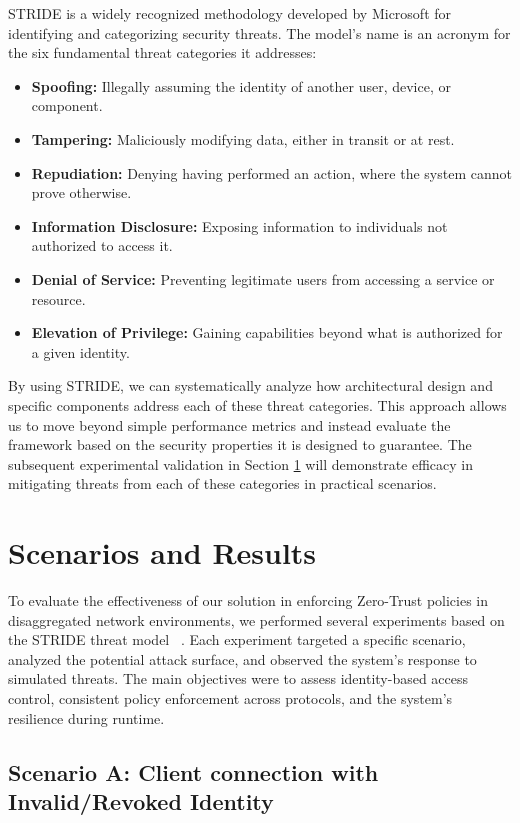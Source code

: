 \documentclass[12pt, a4paper, reqno, oneside]{book}
\begin{document}
STRIDE is a widely recognized methodology developed by Microsoft for identifying and categorizing security threats. The model's name is an acronym for the six fundamental threat categories it addresses:

\begin{itemize}
    \item \textbf{Spoofing:} Illegally assuming the identity of another user, device, or component.
    \item \textbf{Tampering:} Maliciously modifying data, either in transit or at rest.
    \item \textbf{Repudiation:} Denying having performed an action, where the system cannot prove otherwise.
    \item \textbf{Information Disclosure:} Exposing information to individuals not authorized to access it.
    \item \textbf{Denial of Service:} Preventing legitimate users from accessing a service or resource.
    \item \textbf{Elevation of Privilege:} Gaining capabilities beyond what is authorized for a given identity.
\end{itemize}

By using STRIDE, we can systematically analyze how architectural design and specific components address each of these threat categories. This approach allows us to move beyond simple performance metrics and instead evaluate the framework based on the security properties it is designed to guarantee. The subsequent experimental validation in Section \ref{sec:scenarios} will demonstrate efficacy in mitigating threats from each of these categories in practical scenarios.

\section{Scenarios and Results}
\label{sec:scenarios}
To evaluate the effectiveness of our solution in enforcing Zero-Trust policies in disaggregated network environments, we performed several experiments based on the STRIDE threat model ~\cite{Khan2017stride, ruffy2016stride}. Each experiment targeted a specific scenario, analyzed the potential attack surface, and observed the system's response to simulated threats. The main objectives were to assess identity-based access control, consistent policy enforcement across protocols, and the system's resilience during runtime.

\subsection{Scenario A: Client connection with Invalid/Revoked Identity}
\end{document}

